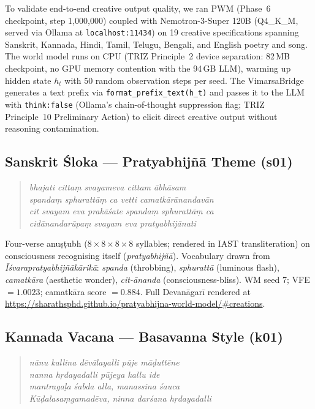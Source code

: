 \documentclass[journal,onecolumn,11pt]{IEEEtran}
\begin{document}
To validate end-to-end creative output quality, we ran PWM (Phase~6 checkpoint,
step 1{,}000{,}000) coupled with Nemotron-3-Super 120B (Q4\_K\_M, served via
Ollama at \texttt{localhost:11434}) on 19 creative specifications spanning
Sanskrit, Kannada, Hindi, Tamil, Telugu, Bengali, and English poetry and song.
The world model runs on CPU (TRIZ Principle~2 device separation: 82\,MB checkpoint,
no GPU memory contention with the 94\,GB LLM), warming up hidden state $h_t$
with 50 random observation steps per seed.
The VimarsaBridge generates a text prefix via \texttt{format\_prefix\_text(h\_t)}
and passes it to the LLM with \texttt{think:false} (Ollama's chain-of-thought
suppression flag; TRIZ Principle~10 Preliminary Action) to elicit direct
creative output without reasoning contamination.

\subsection{Sanskrit Śloka --- Pratyabhijñā Theme (s01)}\label{sec:s01}

\begin{quote}
\small\itshape
bhajati cittaṃ svayameva cittam ābhāsam \textbar \\
spandaṃ sphurattāṃ ca vetti camatkārānandavān \textbar \\
cit svayam eva prakāśate spandaṃ sphurattāṃ ca \textbar \\
cidānandarūpaṃ svayam eva pratyabhijānati \textbar\textbar
\end{quote}

Four-verse anuṣṭubh ($8{\times}8{\times}8{\times}8$ syllables; rendered in IAST
transliteration) on consciousness recognising itself (\emph{pratyabhijñā}).
Vocabulary drawn from \emph{Īśvarapratyabhijñākārikā}:
\emph{spanda} (throbbing), \emph{sphurattā} (luminous flash), \emph{camatkāra}
(aesthetic wonder), \emph{cit-ānanda} (consciousness-bliss).
WM seed 7; VFE $= 1.0023$; camatkāra score $= 0.884$.
Full Devanāgarī rendered at \url{https://sharathsphd.github.io/pratyabhijna-world-model/#creations}.

\subsection{Kannada Vacana --- Basavanna Style (k01)}\label{sec:k01}

\begin{quote}
\small\itshape
nānu kallina dēvālayalli pūje māḍuttēne \\
nanna hṛdayadalli pūjeya kallu ide \\
mantragaḷa śabda alla, manassina śauca \\
Kūḍalasaṃgamadēva, ninna darśana hṛdayadalli
\end{quote}
\end{document}
